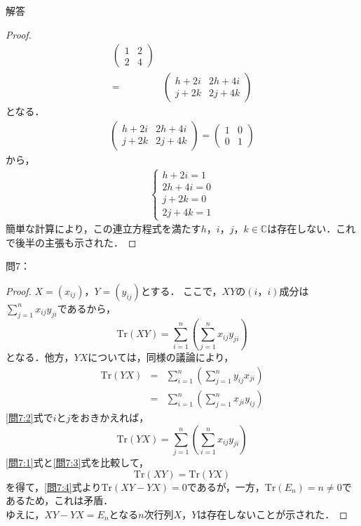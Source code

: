 \documentclass[dvipdfmx,uplatex,11pt]{jsarticle}
\begin{document}
\begin{leftbar}
\begin{itembox}[c]{解答}
\begin{proof}
\begin{align}
\begin{pmatrix}
1 & 2 \\
2 & 4
\end{pmatrix}
\\
 =&
\begin{pmatrix}
h+2 i & 2h + 4i \\
j + 2k & 2j +4k
\end{pmatrix}
\end{align}
となる．
\begin{gather*}
\begin{pmatrix}
h+2 i & 2h + 4i \\
j + 2k & 2j +4k
\end{pmatrix}
=
\begin{pmatrix}
1 & 0 \\
0 & 1 
\end{pmatrix}
\end{gather*}
から，
\begin{gather*}
\begin{cases}
h+2 i =1 \\
2h + 4i =0 \\
j + 2k =0 \\
2j +4k =1
\end{cases}
\end{gather*}
簡単な計算により，この連立方程式を満たす$h，i，j，k \in \mathbb{C}$は存在しない．これで後半の主張も示された．
\end{proof}
\end{itembox}
\end{leftbar}
%
\newpage
\setcounter{equation}{0}
問7：
\begin{leftbar}
\begin{proof}
$X=(x_{ij})$，$Y=(y_{ij})$とする．
ここで，$XY$の$(i，i)$成分は$\sum_{j=1}^{n} x_{ij} y_{ji}$であるから，
\begin{equation}
\label{問7:1}
\mathrm{Tr}(XY)  =  \sum_{i=1}^{n} \left( \sum_{j=1}^{n} x_{ij} y_{ji} \right)
\end{equation}
となる．他方，$YX$については，同様の議論により，
\begin{eqnarray}
\mathrm{Tr} (YX) & = & \sum_{i=1}^{n} \left( \sum_{j=1}^{n}  y_{ij} x_{ji} \right) \nonumber \\
\label{問7:2}
 & = & \sum_{i=1}^{n} \left( \sum_{j=1}^{n}  x_{ji} y_{ij}  \right)
\end{eqnarray}
\eqref{問7:2}式で$i$と$j$をおきかえれば，
\begin{equation}
\label{問7:3}
\mathrm{Tr} (YX) = \sum_{j=1}^{n} \left( \sum_{i=1}^{n}  x_{ij} y_{ji}  \right)
\end{equation}
\eqref{問7:1}式と\eqref{問7:3}式を比較して，
\begin{equation}
\label{問7:4}
\mathrm{Tr} (XY) = \mathrm{Tr} (YX)
\end{equation}
を得て，\eqref{問7:4}式より$\mathrm{Tr} (XY-YX) =0$であるが，一方，$\mathrm{Tr} (E_n) =n \neq 0$であるため，これは矛盾．\\
ゆえに，$XY-YX=E_n$となる$n$次行列$X$，$Y$は存在しないことが示された．
\end{proof}
\end{leftbar}
\end{document}
